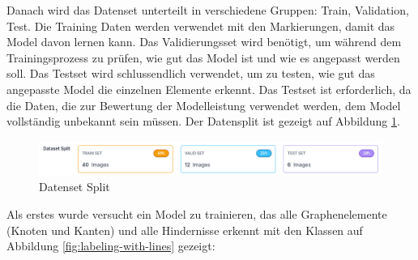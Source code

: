 Danach wird das Datenset unterteilt in verschiedene Gruppen: Train, Validation, Test. Die Training Daten werden verwendet mit den Markierungen, damit das Model davon lernen kann. Das Validierungsset wird benötigt, um während dem Trainingsprozess zu prüfen, wie gut das Model ist und wie es angepasst werden soll. Das Testset wird schlussendlich verwendet, um zu testen, wie gut das angepasste Model die einzelnen Elemente erkennt. Das Testset ist erforderlich, da die Daten, die zur Bewertung der Modelleistung verwendet werden, dem Model vollständig unbekannt sein müssen. Der Datensplit ist gezeigt auf Abbildung \ref{fig:data-split}.

\begin{figure}[H]
    \centering
    \includegraphics[width=\linewidth]{assets/informatik-prototyp/yolo/dataset-split.png}
    \caption{Datenset Split}
    \label{fig:data-split}
\end{figure}

Als erstes wurde versucht ein Model zu trainieren, das alle Graphenelemente (Knoten und Kanten) und alle Hindernisse erkennt mit den Klassen auf Abbildung \ref{fig:labeling-with-lines} gezeigt:


